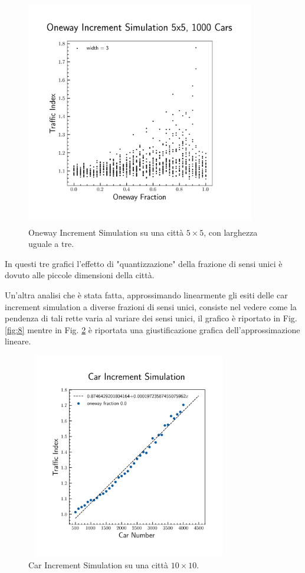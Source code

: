 \documentclass[main.tex]{subfiles}
\begin{document}
        \begin{figure}[H]
            \centering
            \includegraphics[width=10cm, height=10cm]{oneway_increment_3.png}  
            \caption{Oneway Increment Simulation su una città $5 \times 5$, con larghezza uguale a tre.}
            \label{fig:7}
        \end{figure}

        In questi tre grafici l'effetto di "quantizzazione" della frazione di sensi unici è dovuto alle piccole dimensioni della città.\\
        \newpage

        Un'altra analisi che è stata fatta, approssimando linearmente gli esiti delle car increment simulation a diverse frazioni di sensi unici, consiste nel vedere
        come la pendenza di tali rette varia al variare dei sensi unici, il grafico è riportato in Fig. \ref{fig:8} mentre in Fig. \ref{fig:9} è riportata 
        una giustificazione grafica dell'approssimazione lineare.

        \begin{figure}[H]
            \centering
            \includegraphics[width=9cm, height=9cm]{car_increment.png}
            \caption{Car Increment Simulation su una città $10 \times 10$.}
            \label{fig:9}
        \end{figure}
\end{document}
